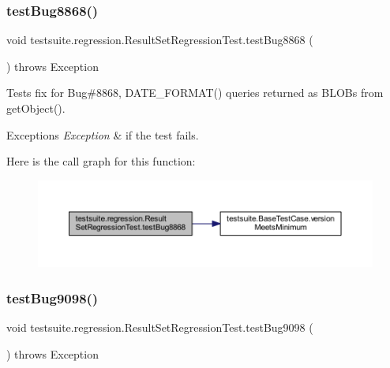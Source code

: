 \subsubsection{\texorpdfstring{test\+Bug8868()}{testBug8868()}}
{\footnotesize\ttfamily void testsuite.\+regression.\+Result\+Set\+Regression\+Test.\+test\+Bug8868 (\begin{DoxyParamCaption}{ }\end{DoxyParamCaption}) throws Exception}

Tests fix for Bug\#8868, D\+A\+T\+E\+\_\+\+F\+O\+R\+M\+A\+T() queries returned as B\+L\+O\+Bs from get\+Object().


\begin{DoxyExceptions}{Exceptions}
{\em Exception} & if the test fails. \\
\hline
\end{DoxyExceptions}
Here is the call graph for this function\+:
\nopagebreak
\begin{figure}[H]
\begin{center}
\leavevmode
\includegraphics[width=350pt]{classtestsuite_1_1regression_1_1_result_set_regression_test_a2d7ec45736b6d8ba77d988e4dae8c5a0_cgraph}
\end{center}
\end{figure}
\mbox{\label{classtestsuite_1_1regression_1_1_result_set_regression_test_a73f559230b24a5776a1ce47569f3f82a}} 
\subsubsection{\texorpdfstring{test\+Bug9098()}{testBug9098()}}
{\footnotesize\ttfamily void testsuite.\+regression.\+Result\+Set\+Regression\+Test.\+test\+Bug9098 (\begin{DoxyParamCaption}{ }\end{DoxyParamCaption}) throws Exception}

